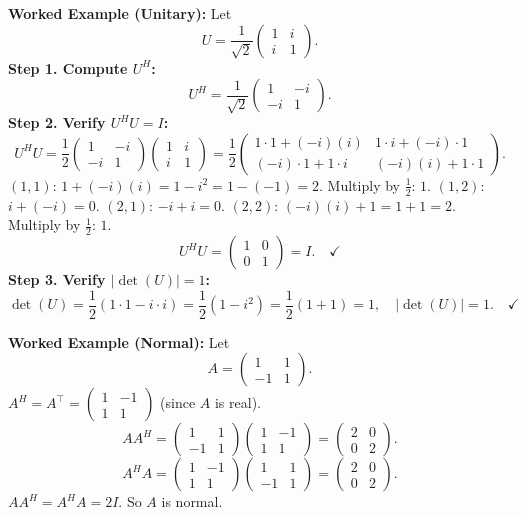 \documentclass[12pt,a4paper]{article}
\begin{document}
\textbf{Worked Example (Unitary):} Let
\[
  U = \frac{1}{\sqrt{2}}\begin{pmatrix} 1 & i \\ i & 1 \end{pmatrix}.
\]
\textbf{Step 1. Compute $U^H$:}
\[
  U^H = \frac{1}{\sqrt{2}}\begin{pmatrix} 1 & -i \\ -i & 1 \end{pmatrix}.
\]
\textbf{Step 2. Verify $U^H U = I$:}
\[
  U^H U = \frac{1}{2}\begin{pmatrix} 1 & -i \\ -i & 1 \end{pmatrix}\begin{pmatrix} 1 & i \\ i & 1 \end{pmatrix}
        = \frac{1}{2}\begin{pmatrix} 1\cdot1 + (-i)(i) & 1\cdot i + (-i)\cdot1 \\ (-i)\cdot1 + 1\cdot i & (-i)(i) + 1\cdot1 \end{pmatrix}.
\]
$(1,1)$: $1 + (-i)(i) = 1 - i^2 = 1 - (-1) = 2$. Multiply by $\tfrac{1}{2}$: $1$.
$(1,2)$: $i + (-i) = 0$.
$(2,1)$: $-i + i = 0$.
$(2,2)$: $(-i)(i) + 1 = 1 + 1 = 2$. Multiply by $\tfrac{1}{2}$: $1$.
\[
  U^H U = \begin{pmatrix} 1 & 0 \\ 0 & 1 \end{pmatrix} = I. \quad \checkmark
\]
\textbf{Step 3. Verify $|\det(U)| = 1$:}
\[
  \det(U) = \frac{1}{2}(1 \cdot 1 - i \cdot i) = \frac{1}{2}(1 - i^2) = \frac{1}{2}(1+1) = 1,
  \quad |\det(U)| = 1. \quad \checkmark
\]

\textbf{Worked Example (Normal):} Let
\[
  A = \begin{pmatrix} 1 & 1 \\ -1 & 1 \end{pmatrix}.
\]
$A^H = A^\top = \begin{pmatrix}1 & -1 \\ 1 & 1\end{pmatrix}$ (since $A$ is real).
\[
  AA^H = \begin{pmatrix}1&1\\-1&1\end{pmatrix}\begin{pmatrix}1&-1\\1&1\end{pmatrix}
       = \begin{pmatrix}2&0\\0&2\end{pmatrix}.
\]
\[
  A^H A = \begin{pmatrix}1&-1\\1&1\end{pmatrix}\begin{pmatrix}1&1\\-1&1\end{pmatrix}
        = \begin{pmatrix}2&0\\0&2\end{pmatrix}.
\]
$AA^H = A^H A = 2I$. \quad \checkmark \quad So $A$ is normal.
\end{document}
